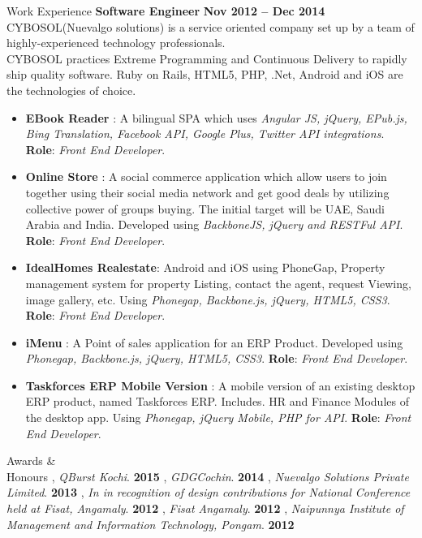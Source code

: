 \documentclass{resume}
\begin{document}
\begin{category}{Work Experience}
  \citemnobullet \textbf{Software Engineer} \hfill \textbf{Nov 2012 -- Dec 2014}
  \citemnobullet CYBOSOL(Nuevalgo solutions) is a service oriented company set up by a team of highly-experienced technology professionals. \\CYBOSOL practices Extreme Programming and Continuous
  Delivery to rapidly ship quality software. Ruby on Rails, HTML5, PHP, .Net, Android and iOS are the technologies of choice.
  \begin{itemize}
  \item \textbf{EBook Reader} : A bilingual SPA which uses {\em Angular JS, jQuery, EPub.js, Bing Translation, Facebook API, Google Plus, Twitter API integrations}. \textbf{Role}: {\em Front End Developer}.  
  \item \textbf{Online Store} : A social commerce application which allow users to join together using their social media network and get good deals by utilizing collective power of groups buying. The initial target will be UAE, Saudi Arabia and India. Developed using {\em BackboneJS, jQuery and RESTFul API}. \textbf{Role}: {\em Front End Developer}.
  \item \textbf{IdealHomes Realestate}: Android and iOS using PhoneGap, Property management system for property Listing, contact the agent, request Viewing, image gallery, etc. Using {\em Phonegap, Backbone.js, jQuery, HTML5, CSS3}. \textbf{Role}: {\em Front End Developer}.
  \item \textbf{iMenu} : A Point of sales application for an ERP Product. Developed using {\em Phonegap, Backbone.js, jQuery, HTML5, CSS3}. \textbf{Role}: {\em Front End Developer}.
  \item \textbf{Taskforces ERP Mobile Version} : A mobile version of an existing desktop ERP product, named Taskforces ERP. Includes. HR and Finance Modules of the desktop app. Using{\em
      Phonegap, jQuery Mobile, PHP for API}. \textbf{Role}: {\em Front End Developer}. 
  \end{itemize}
\end{category}


\begin{category}{Awards \&\\ Honours}
  , {\em QBurst Kochi}. \hfill \textbf{2015}
  , {\em GDGCochin}. \hfill \textbf{2014}
  , {\em Nuevalgo Solutions Private Limited}. \hfill \textbf{2013}
  , {\em  In in recognition of design contributions for National Conference held at Fisat, Angamaly}. \hfill \textbf{2012}
  , {\em Fisat Angamaly}. \hfill \textbf{2012}
  , {\em  Naipunnya  Institute  of  Management  and  Information  Technology, Pongam}. \hfill \textbf{2012}
\end{category}
\end{document}
